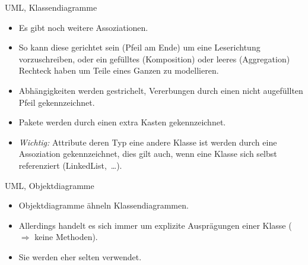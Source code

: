 \begin{frame}{UML, Klassendiagramme}
    \begin{itemize}[<+(1)->]
        \item Es gibt noch weitere Assoziationen.
        \item So kann diese gerichtet sein (Pfeil am Ende) um eine Leserichtung vorzuschreiben,\pause{} oder ein gefülltes (Komposition) oder leeres (Aggregation) Rechteck haben um Teile eines Ganzen zu modellieren.
        \item Abhängigkeiten werden gestrichelt, Vererbungen durch einen nicht augefüllten Pfeil gekennzeichnet.
        \item Pakete werden durch einen extra Kasten gekennzeichnet.
        \item \textit{Wichtig:} Attribute deren Typ eine andere Klasse ist werden durch eine Assoziation gekennzeichnet,\pause{} dies gilt auch, wenn eine Klasse sich selbst referenziert\pause{} (LinkedList,~\ldots).
    \end{itemize}
\end{frame}

\begin{frame}{UML, Objektdiagramme}
    \hypertarget<1>{uml:object}{}\begin{itemize}[<+(1)->]
        \item Objektdiagramme ähneln Klassendiagrammen.
        \item Allerdings handelt es sich immer um explizite Ausprägungen einer Klasse\pause{} (\(\Rightarrow\) keine Methoden).
        \item Sie werden eher selten verwendet.
    \end{itemize}
    \vfill\pause{}
    \begin{center}
    \end{center}\vfill\hbox{}
\end{frame}

